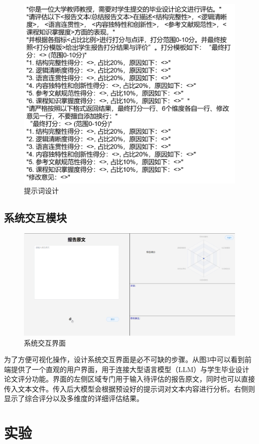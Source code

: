 \documentclass{article}
\begin{document}
\begin{figure}[H]
    \centering
    \includegraphics[width=0.75\linewidth]{img/prompt.png}
    \caption{提示词设计}
    \label{fig:prompt}
\end{figure}

\subsection{系统交互模块}

\begin{figure}[H]
    \centering
    \includegraphics[width=0.9\linewidth]{img/frontEnd.png}
    \caption{系统交互界面}
    \label{fig:frontEnd}
\end{figure}

为了方便可视化操作，设计系统交互界面是必不可缺的步骤。从图3中可以看到前端提供了一个直观的用户界面，用于连接大型语言模型（LLM）与学生毕业设计论文评分功能。界面的左侧区域专门用于输入待评估的报告原文，同时也可以直接传入文本文件。传入后大模型会根据预设好的提示词对文本内容进行分析。右侧则显示了综合评分以及多维度的详细评估结果。

\section{实验}
\end{document}
